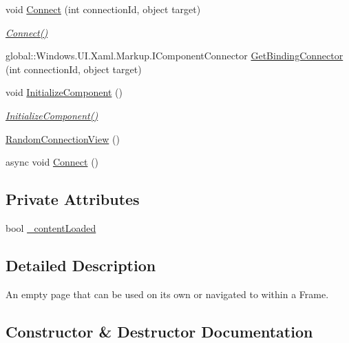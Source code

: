 \begin{DoxyCompactItemize}
void \hyperlink{class_e_l_i_client_1_1_views_1_1_random_connection_view_a566a44c8030e725eb7e895c15471523b}{Connect} (int connection\+Id, object target)
\begin{DoxyCompactList}\small\item\em \hyperlink{class_e_l_i_client_1_1_views_1_1_random_connection_view_af286900d7e9f4f493dc32434ffadd38e}{Connect()} \end{DoxyCompactList}\item 
global\+::\+Windows.\+U\+I.\+Xaml.\+Markup.\+I\+Component\+Connector \hyperlink{class_e_l_i_client_1_1_views_1_1_random_connection_view_a2638dea21d4a8b188fce66c668730a27}{Get\+Binding\+Connector} (int connection\+Id, object target)
\item 
void \hyperlink{class_e_l_i_client_1_1_views_1_1_random_connection_view_a64aed3e5ad3626eecf77464df5d0f123}{Initialize\+Component} ()
\begin{DoxyCompactList}\small\item\em \hyperlink{class_e_l_i_client_1_1_views_1_1_random_connection_view_a64aed3e5ad3626eecf77464df5d0f123}{Initialize\+Component()} \end{DoxyCompactList}\item 
\hyperlink{class_e_l_i_client_1_1_views_1_1_random_connection_view_a603c6d53bc6eccddb8874815ce4b9bff}{Random\+Connection\+View} ()
\item 
async void \hyperlink{class_e_l_i_client_1_1_views_1_1_random_connection_view_af286900d7e9f4f493dc32434ffadd38e}{Connect} ()
\end{DoxyCompactItemize}
\subsection*{Private Attributes}
\begin{DoxyCompactItemize}
\item 
bool \hyperlink{class_e_l_i_client_1_1_views_1_1_random_connection_view_acfb9bf9b0d8a09e90981f453a1a108f3}{\+\_\+content\+Loaded}
\end{DoxyCompactItemize}


\subsection{Detailed Description}
An empty page that can be used on its own or navigated to within a Frame. 



\subsection{Constructor \& Destructor Documentation}
\mbox{\label{class_e_l_i_client_1_1_views_1_1_random_connection_view_a603c6d53bc6eccddb8874815ce4b9bff}} 
